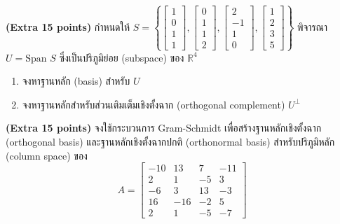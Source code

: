 ﻿\documentclass[12pt, a4paper]{exam}
\begin{document}
\begin{questions}
\question \textbf{(Extra 15 points)} กำหนดให้ $S = \left\{ \begin{bmatrix} 1 \\ 0 \\ 1 \\ 1 \end{bmatrix}, \begin{bmatrix} 0 \\ 1 \\ 1 \\ 2 \end{bmatrix}, \begin{bmatrix} 2 \\ -1 \\ 1 \\ 0 \end{bmatrix}, \begin{bmatrix} 1 \\ 2 \\ 3 \\ 5 \end{bmatrix} \right\}$ พิจารณา $U = \text{Span } S$ ซึ่งเป็นปริภูมิย่อย (subspace) ของ $\mathbb{R}^4$
\begin{enumerate}[label=(\alph*)]
    \item จงหาฐานหลัก (basis) สำหรับ $U$
    \item จงหาฐานหลักสำหรับส่วนเติมเต็มเชิงตั้งฉาก (orthogonal complement) $U^\perp$
\end{enumerate}

\question \textbf{(Extra 15 points)} จงใช้กระบวนการ Gram-Schmidt เพื่อสร้างฐานหลักเชิงตั้งฉาก (orthogonal basis) และฐานหลักเชิงตั้งฉากปกติ (orthonormal basis) สำหรับปริภูมิหลัก (column space) ของ
\[
A = \begin{bmatrix} -10 & 13 & 7 & -11 \\ 2 & 1 & -5 & 3 \\ -6 & 3 & 13 & -3 \\ 16 & -16 & -2 & 5 \\ 2 & 1 & -5 & -7 \end{bmatrix}
\]


\end{questions}
\end{document}
